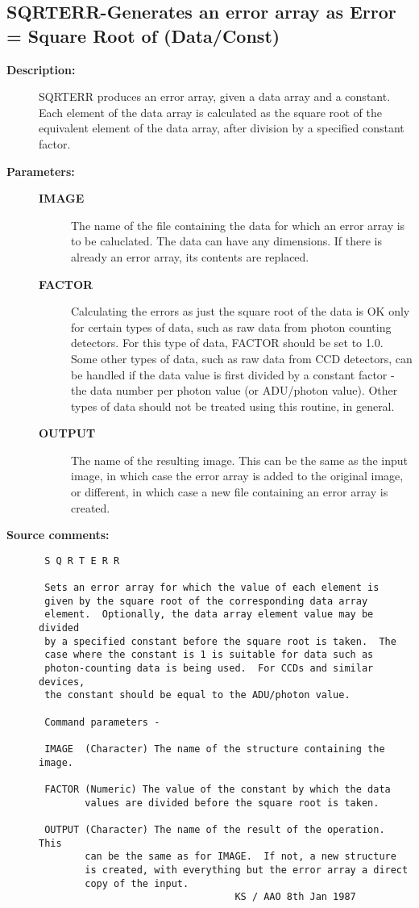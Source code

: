\subsection{SQRTERR-\label{SQRTERR}Generates an error array as Error = Square Root of (Data/Const)}
\begin{description}

\item [{\bf Description:}]
 SQRTERR produces an error array, given a data array and a
 constant.  Each element of the data array is calculated as
 the square root of the equivalent element of the data array,
 after division by a specified constant factor.

\item [{\bf Parameters:}]
\begin{description}
\item [{\bf IMAGE}]
 The name of the file containing the data
 for which an error array is to be caluclated.  The
 data can have any dimensions.  If there is already
 an error array, its contents are replaced.
\item [{\bf FACTOR}]
 Calculating the errors as just the square root of
 the data is OK only for certain types of data, such
 as raw data from photon counting detectors.  For this
 type of data, FACTOR should be set to 1.0.  Some other
 types of data, such as raw data from CCD detectors,
 can be handled if the data value is first divided by
 a constant factor - the data number per photon value (or
 ADU/photon value).  Other types of data should not be
 treated using this routine, in general.
\item [{\bf OUTPUT}]
 The name of the resulting image.  This
 can be the same as the input image, in which case the
 error array is added to the original image, or different,
 in which case a new file containing an error array is
 created.
\end{description}

\item [{\bf Source comments:}]
\begin{verbatim}
 S Q R T E R R

 Sets an error array for which the value of each element is
 given by the square root of the corresponding data array
 element.  Optionally, the data array element value may be divided
 by a specified constant before the square root is taken.  The
 case where the constant is 1 is suitable for data such as
 photon-counting data is being used.  For CCDs and similar devices,
 the constant should be equal to the ADU/photon value.

 Command parameters -

 IMAGE  (Character) The name of the structure containing the image.

 FACTOR (Numeric) The value of the constant by which the data
        values are divided before the square root is taken.

 OUTPUT (Character) The name of the result of the operation.  This
        can be the same as for IMAGE.  If not, a new structure
        is created, with everything but the error array a direct
        copy of the input.
                                  KS / AAO 8th Jan 1987
\end{verbatim}
\end{description}
